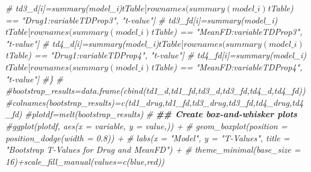 \documentclass[
]{article}
\newenvironment{Shaded}{\begin{snugshade}}{\end{snugshade}}
\newcommand{\CommentTok}[1]{\textcolor[rgb]{0.56,0.35,0.01}{\textit{#1}}}
\newcommand{\DocumentationTok}[1]{\textcolor[rgb]{0.56,0.35,0.01}{\textbf{\textit{#1}}}}
\begin{document}
\begin{Shaded}
\begin{Highlighting}[]
\CommentTok{\#  td3\_d[i]=summary(model\_i)$tTable[rownames(summary(model\_i)$tTable) == "Drug1:variableTDProp3", "t{-}value"]}
\CommentTok{\#  td3\_fd[i]=summary(model\_i)$tTable[rownames(summary(model\_i)$tTable) == "MeanFD:variableTDProp3", "t{-}value"]}
\CommentTok{\#  td4\_d[i]=summary(model\_i)$tTable[rownames(summary(model\_i)$tTable) == "Drug1:variableTDProp4", "t{-}value"]}
\CommentTok{\#  td4\_fd[i]=summary(model\_i)$tTable[rownames(summary(model\_i)$tTable) == "MeanFD:variableTDProp4", "t{-}value"]}
\CommentTok{\#\}}
\CommentTok{\#}
\CommentTok{\#bootstrap\_results=data.frame(cbind(td1\_d,td1\_fd,td3\_d,td3\_fd,td4\_d,td4\_fd))}
\CommentTok{\#colnames(bootstrap\_results)=c(\textquotesingle{}td1\_drug\textquotesingle{},\textquotesingle{}td1\_fd\textquotesingle{},\textquotesingle{}td3\_drug\textquotesingle{},\textquotesingle{}td3\_fd\textquotesingle{},\textquotesingle{}td4\_drug\textquotesingle{},\textquotesingle{}td4\_fd\textquotesingle{})}
\CommentTok{\#plotdf=melt(bootstrap\_results)}
\CommentTok{\#}
\DocumentationTok{\#\# Create box{-}and{-}whisker plots}
\CommentTok{\#ggplot(plotdf, aes(x = variable, y = value,)) +}
\CommentTok{\#  geom\_boxplot(position = position\_dodge(width = 0.8)) +}
\CommentTok{\#  labs(x = "Model", y = "T{-}Values", title = "Bootstrap T{-}Values for Drug and MeanFD") +}
\CommentTok{\#  theme\_minimal(base\_size = 16)+scale\_fill\_manual(values=c(\textquotesingle{}blue\textquotesingle{},\textquotesingle{}red\textquotesingle{}))}
\end{Highlighting}
\end{Shaded}
\end{document}
